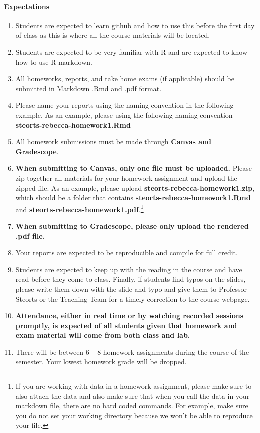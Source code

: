 \documentclass[11pt]{article}
\begin{document}


\paragraph{Expectations}
\begin{enumerate}
\item Students are expected to learn github and how to use this before the first day of class as this is where all the course materials will be located. 
\item Students are expected to be very familiar with R and are expected to know how to use R markdown. 
\item All homeworks, reports, and take home exams (if applicable) should be submitted in Markdown .Rmd and .pdf format. 
\item Please name your reports using the naming convention in the following example. As an example, please using the following naming convention \textbf{steorts-rebecca-homework1.Rmd} 
\item All homework submissions must be made through \textbf{Canvas and Gradescope}.
\item  \textbf{When submitting to Canvas, only one file must be uploaded.} Please zip together all materials for your homework assignment and upload the zipped file. As an example, please upload \textbf{steorts-rebecca-homework1.zip}, which should be a folder that contains \textbf{steorts-rebecca-homework1.Rmd}  and \textbf{steorts-rebecca-homework1.pdf}.\footnote{If you are working with data in a homework assignment, please make sure to also attach the data and also make sure that when you call the data in your markdown file, there are no hard coded commands. For example, make sure you do not set your working directory because we won't be able to reproduce your file.}
\item \textbf{When submitting to Gradescope, please only upload the rendered .pdf file.}
\item Your reports are expected to be reproducible and compile for full credit. 
\item Students are expected to keep up with the reading in the course and have read before they come to class. Finally, if students find typos on the slides, please write them down with the slide and typo and give them to Professor Steorts or the Teaching Team for a timely correction to the course webpage.  
\item \textbf{Attendance, either in real time or by watching recorded sessions promptly, is expected of all students given that homework and exam material will come from both class and lab.}
\item There will be between 6 -- 8 homework assignments during the course of the semester.  Your lowest homework grade will be dropped. 
\end{enumerate}
\end{document}
